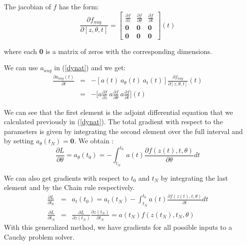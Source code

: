\documentclass[10pt,a4paper]{article}
\theoremstyle{definition}
\theoremstyle{definition}
\theoremstyle{definition}
\begin{document}
The jacobian of $f$ has the form:
\begin{equation*}
\frac{\partial f_{aug}}{\partial [z,\theta,t]} = \begin{bmatrix}
\frac{\partial f}{\partial z} & \frac{\partial f}{\partial \theta} & \frac{\partial f}{\partial t} \\
\textbf{0} & \textbf{0} & \textbf{0} \\
\textbf{0} & \textbf{0} & \textbf{0}
\end{bmatrix}(t)
\end{equation*}

where each \textbf{0} is a matrix of zeros with the corresponding dimensions.

We can use $a_{aug}$ in (\ref{dynat}) and we get:
\begin{eqnarray*}
\frac{\partial a_{aug}(t)}{\partial t} 
&=& - [a(t) \ a_\theta (t) \ a_t (t)]\frac{\partial f_{aug}}{\partial [ z,\theta , t]}(t) \\
&=& -\Big[a\frac{\partial f}{\partial z} \ a\frac{\partial f}{\partial \theta} \ a\frac{\partial  f}{\partial t}\Big] (t)
\end{eqnarray*}


We can see that the first element is the adjoint differential equation that we calculated previously in (\ref{dynat}). The total gradient with respect to the parameters is given by integrating the second element over the full interval and by setting $a_\theta (t_N) = \textbf{0}$. We obtain :
\begin{equation*}
\frac{\partial L}{\partial \theta} = a_\theta (t_0) = - \int_{t_N}^{t_0} a(t) \frac{\partial f(z(t),t,\theta)}{\partial \theta} dt
\end{equation*}


We can also get gradients with respect to $t_0$ and $t_N$ by integrating the last element and by the Chain rule respectively.
\begin{eqnarray*}
\frac{\partial L}{\partial t_0} &=& a_t(t_0) = a_t(t_N) - \int_{t_N}^{t_0} a(t) \frac{\partial f(z(t),t,\theta)}{\partial t} dt \\
\frac{\partial L}{\partial t_N} &=& \frac{\partial L}{\partial z(t_N)} \frac{\partial z(t_N)}{\partial t_N} = a(t_N)f(z(t_N),t_N,\theta)
\end{eqnarray*}
With this generalized method, we have gradients for all possible inputs to a Cauchy problem solver.


\end{document}
